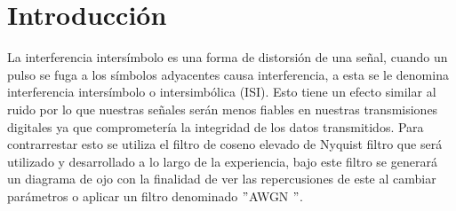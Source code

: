 \section{Introducción}\label{sec:introduccion}

La interferencia intersímbolo es una forma de distorsión de una señal, cuando un pulso se fuga a los símbolos adyacentes causa interferencia, a esta se le denomina interferencia intersímbolo o intersimbólica (ISI). Esto tiene un efecto similar al ruido por lo que nuestras señales serán menos fiables en nuestras transmisiones digitales ya que comprometería la integridad de los datos transmitidos. 
 Para contrarrestar esto se utiliza el filtro de coseno elevado de Nyquist filtro que será utilizado y desarrollado a lo largo de la experiencia, bajo este filtro se generará un diagrama de ojo con la finalidad de ver las repercusiones de este al cambiar parámetros o aplicar un filtro denominado $"$AWGN $"$.


